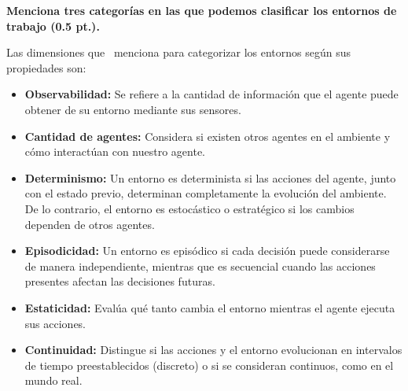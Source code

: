 \textbf{Menciona tres categorías en las que podemos clasificar los entornos de trabajo (0.5 pt.).} \vspace{.3cm}

Las dimensiones que~\cite{SotoAstorga2025} menciona para categorizar los entornos según sus propiedades son:

\begin{itemize}
    \item \textbf{Observabilidad:} Se refiere a la cantidad de información que el agente puede obtener de su entorno mediante sus sensores. 
    \item \textbf{Cantidad de agentes:} Considera si existen otros agentes en el ambiente y cómo interactúan con nuestro agente.
    \item \textbf{Determinismo:} Un entorno es determinista si las acciones del agente, junto con el estado previo, determinan completamente la evolución del ambiente. De lo contrario, el entorno es estocástico o estratégico si los cambios dependen de otros agentes.
    \item \textbf{Episodicidad:} Un entorno es episódico si cada decisión puede considerarse de manera independiente, mientras que es secuencial cuando las acciones presentes afectan las decisiones futuras.
    \item \textbf{Estaticidad:} Evalúa qué tanto cambia el entorno mientras el agente ejecuta sus acciones. 
    \item \textbf{Continuidad:} Distingue si las acciones y el entorno evolucionan en intervalos de tiempo preestablecidos (discreto) o si se consideran continuos, como en el mundo real.
\end{itemize}
